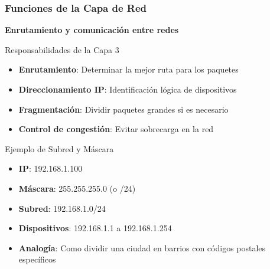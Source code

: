 \documentclass[aspectratio=169]{beamer}
\begin{document}
            \begin{frame}
            \frametitle{Funciones de la Capa de Red}
            
            \begin{center}
            \Large \textbf{Enrutamiento y comunicación entre redes}
            \end{center}
         
            
            \begin{block}{Responsabilidades de la Capa 3}
            \begin{itemize}
            \item \textbf{Enrutamiento}: Determinar la mejor ruta para los paquetes
            \item \textbf{Direccionamiento IP}: Identificación lógica de dispositivos
            \item \textbf{Fragmentación}: Dividir paquetes grandes si es necesario
            \item \textbf{Control de congestión}: Evitar sobrecarga en la red
            \end{itemize}
            \end{block}
            
            \begin{block}{Ejemplo de Subred y Máscara}
            \begin{itemize}
            \item \textbf{IP}: 192.168.1.100
            \item \textbf{Máscara}: 255.255.255.0 (o /24)
            \item \textbf{Subred}: 192.168.1.0/24
            \item \textbf{Dispositivos}: 192.168.1.1 a 192.168.1.254
            \item \textbf{Analogía}: Como dividir una ciudad en barrios con códigos postales específicos
            \end{itemize}
            \end{block}
            \end{frame}
            
\end{document}

